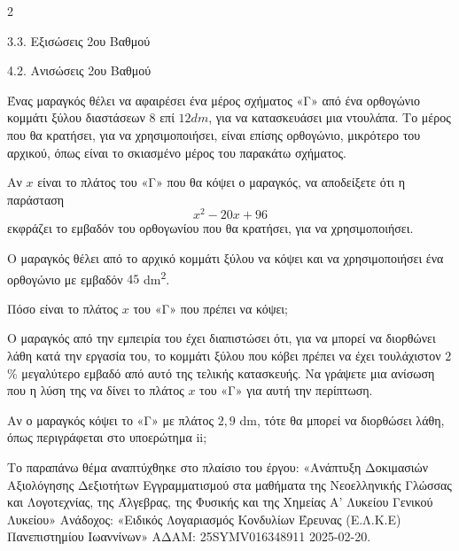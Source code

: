 \begin{ylh}{2}
    \item 3.3. Εξισώσεις 2ου Βαθμού
    \item 4.2. Ανισώσεις 2ου Βαθμού
\end{ylh}

Ένας μαραγκός θέλει να αφαιρέσει ένα μέρος σχήματος «Γ» από ένα ορθογώνιο κομμάτι ξύλου διαστάσεων $8$ επί $12dm$, για να κατασκευάσει μια ντουλάπα. Το μέρος που θα κρατήσει, για να χρησιμοποιήσει, είναι επίσης ορθογώνιο, μικρότερο του αρχικού, όπως είναι το σκιασμένο μέρος του παρακάτω σχήματος.


\begin{alist}
\item Αν $x$ είναι το πλάτος του «Γ» που θα κόψει ο μαραγκός, να αποδείξετε ότι η παράσταση
\begin{equation*}x^{2} - 20x + 96\end{equation*}
εκφράζει το εμβαδόν του ορθογωνίου που θα κρατήσει, για να χρησιμοποιήσει.
\item Ο μαραγκός θέλει από το αρχικό κομμάτι ξύλου να κόψει και να χρησιμοποιήσει ένα ορθογώνιο με εμβαδόν $45$ dm\textsuperscript{2}.
\begin{rlist}
\item Πόσο είναι το πλάτος $x$ του «Γ» που πρέπει να κόψει;
\item Ο μαραγκός από την εμπειρία του έχει διαπιστώσει ότι, για να μπορεί να διορθώνει λάθη κατά την εργασία του, το κομμάτι ξύλου που κόβει πρέπει να έχει τουλάχιστον $2$\% μεγαλύτερο εμβαδό από αυτό της τελικής κατασκευής. Να γράψετε μια ανίσωση που η λύση της να δίνει το πλάτος $x$ του «Γ» για αυτή την περίπτωση.
\item Αν ο μαραγκός κόψει το «Γ» με πλάτος $2,9$ dm, τότε θα μπορεί να διορθώσει λάθη, όπως περιγράφεται στο υποερώτημα ii;

{\footnotesize Το παραπάνω θέμα αναπτύχθηκε στο πλαίσιο του έργου: «Ανάπτυξη Δοκιμασιών Αξιολόγησης Δεξιοτήτων Εγγραμματισμού στα μαθήματα της Νεοελληνικής Γλώσσας και Λογοτεχνίας, της Άλγεβρας, της Φυσικής και της Χημείας Α' Λυκείου Γενικού Λυκείου» Ανάδοχος: «Ειδικός Λογαριασμός Κονδυλίων Έρευνας (Ε.Λ.Κ.Ε) Πανεπιστημίου Ιωαννίνων» ΑΔΑΜ: 25SYMV016348911 2025-02-20.}
\end{rlist}
\end{alist}

